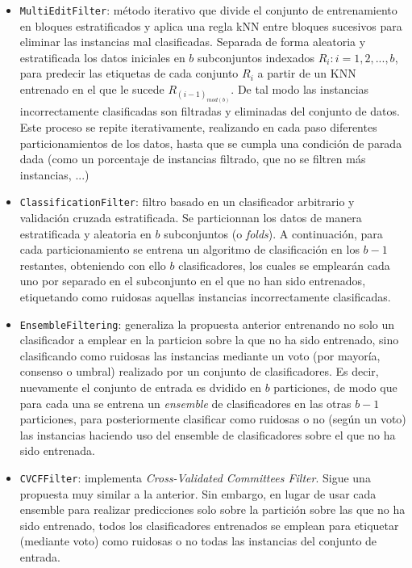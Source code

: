 \documentclass[print, color]{ugrTFG}
\begin{document}
\begin{itemize}
    \item \texttt{MultiEditFilter}: método iterativo que divide el conjunto de entrenamiento en bloques estratificados y aplica una regla kNN entre bloques sucesivos para eliminar las instancias mal clasificadas. Separada de forma aleatoria y estratificada los datos iniciales en $b$ subconjuntos indexados $R_i : i=1,2,...,b$, para predecir las etiquetas de cada conjunto $R_i$ a partir de un KNN entrenado en el que le sucede  $R_{(i-1)_{mod(b)}}$. De tal modo las instancias incorrectamente clasificadas son filtradas y eliminadas del conjunto de datos. Este proceso se repite iterativamente, realizando en cada paso diferentes particionamientos de los datos, hasta que se cumpla una condición de parada dada (como un porcentaje de instancias filtrado, que no se filtren más instancias, ...)
    
    \item \texttt{ClassificationFilter}: filtro basado en un clasificador arbitrario  y validación cruzada estratificada. Se particionnan los datos de manera estratificada y aleatoria en $b$ subconjuntos (o \textit{folds}). A continuación, para cada particionamiento se entrena un algoritmo de clasificación en los $b-1$ restantes, obteniendo con ello $b$ clasificadores, los cuales se emplearán cada uno por separado en el subconjunto en el que no han sido entrenados, etiquetando como ruidosas aquellas instancias incorrectamente clasificadas. 

    \item \texttt{EnsembleFiltering}: generaliza la propuesta anterior entrenando no solo un clasificador a emplear en la particion sobre la que no ha sido entrenado, sino clasificando como ruidosas las instancias mediante un voto (por mayoría, consenso o umbral) realizado por un conjunto de clasificadores. Es decir, nuevamente el conjunto de entrada es dvidido en $b$ particiones, de modo que para cada una se entrena un \textit{ensemble} de clasificadores en las otras $b-1$ particiones, para posteriormente clasificar como ruidosas o no (según un voto) las instancias haciendo uso del ensemble de clasificadores sobre el que no ha sido entrenada.

    
    \item \texttt{CVCFFilter}: implementa \emph{Cross-Validated Committees Filter}. Sigue una propuesta muy similar a la anterior. Sin embargo, en lugar de usar cada ensemble para realizar predicciones solo sobre la partición sobre las que no ha sido entrenado, todos los clasificadores entrenados se emplean para etiquetar (mediante voto) como ruidosas o no todas las instancias del conjunto de entrada.
    

\end{itemize}
\end{document}
